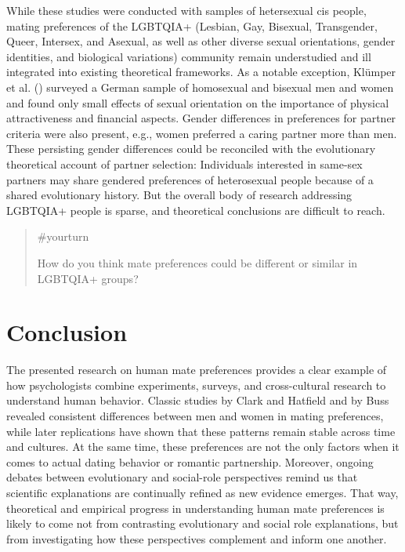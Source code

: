 \documentclass[
  letterpaper,
]{book}
\begin{document}
While these studies were conducted with samples of hetersexual cis
people, mating preferences of the LGBTQIA+ (Lesbian, Gay, Bisexual,
Transgender, Queer, Intersex, and Asexual, as well as other diverse
sexual orientations, gender identities, and biological variations)
community remain understudied and ill integrated into existing
theoretical frameworks. As a notable exception, Klümper et al.
() surveyed a German sample
of homosexual and bisexual men and women and found only small effects of
sexual orientation on the importance of physical attractiveness and
financial aspects. Gender differences in preferences for partner
criteria were also present, e.g., women preferred a caring partner more
than men. These persisting gender differences could be reconciled with
the evolutionary theoretical account of partner selection: Individuals
interested in same-sex partners may share gendered preferences of
heterosexual people because of a shared evolutionary history. But the
overall body of research addressing LGBTQIA+ people is sparse, and
theoretical conclusions are difficult to reach.

\begin{quote}
{\#yourturn}

How do you think mate preferences could be different or similar in
LGBTQIA+ groups?
\end{quote}

\section{Conclusion}\label{conclusion-13}

The presented research on human mate preferences provides a clear
example of how psychologists combine experiments, surveys, and
cross-cultural research to understand human behavior. Classic studies by
Clark and Hatfield and by Buss revealed consistent differences between
men and women in mating preferences, while later replications have shown
that these patterns remain stable across time and cultures. At the same
time, these preferences are not the only factors when it comes to actual
dating behavior or romantic partnership. Moreover, ongoing debates
between evolutionary and social-role perspectives remind us that
scientific explanations are continually refined as new evidence emerges.
That way, theoretical and empirical progress in understanding human mate
preferences is likely to come not from contrasting evolutionary and
social role explanations, but from investigating how these perspectives
complement and inform one another.
\end{document}
